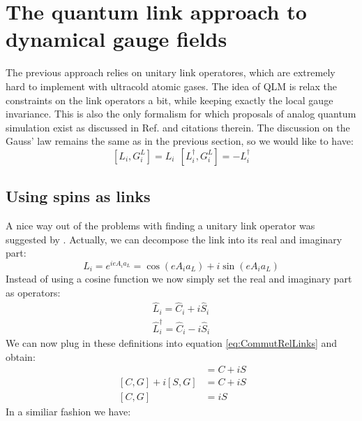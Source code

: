 \documentclass[10pt]{article}
\let\cite\citep
\providecommand\citep{\cite}
\newcommand{\ch}{e}
\newcommand{\aL}{a_L}
\begin{document}
\section{The quantum link approach to dynamical gauge fields}\label{Sec:QLM}
 
 The previous approach relies on unitary link operatores, which are extremely hard to implement with ultracold atomic gases. The idea of QLM is relax the constraints on the link operators a bit, while keeping exactly the local gauge invariance. This is also the only formalism for which proposals of analog quantum simulation exist as discussed in Ref. \cite{Wiese2013,Zohar2016,Kasper_2016,Kasper_2017} and citations therein. The discussion on the Gauss' law remains the same as in the previous section, so we would like to have:
 \begin{equation}\label{eq:CommutRelLinks}
[L_i,G^L_i] = L_i ~~[L^\dag_i,G^L_i] = -L^\dag_i
\end{equation}




\subsection{Using spins as links}
 
A nice way out of the problems with finding a unitary link operator was suggested by \cite{Chandrasekharan1997,Horn1981,Orland1990}. 
Actually, we can decompose the link into its real and imaginary part: 
 \begin{equation}\label{Eq:LatticeWithLink}
 L_i = e^{i\ch A_i \aL} =\cos(\ch A_i \aL) + i\sin(\ch A_i \aL)
 \end{equation}
 Instead of using a cosine function we now simply set the real and imaginary part as operators:
  \begin{eqnarray}
 \hat{L}_i = \hat{C}_i + i\hat{S}_i\\
 \hat{L}_i^\dag = \hat{C}_i - i\hat{S}_i
 \end{eqnarray}
 We can now plug in these definitions into equation \eqref{eq:CommutRelLinks} and obtain:
 \begin{eqnarray}
[C + i S,G] &= C + iS \\
~[C,G] + i [S,G] &= C + iS \\
~[C,G] &= iS \label{Eq:CommSpinLinks}
\end{eqnarray}
In a similiar fashion we have:
\end{document}
